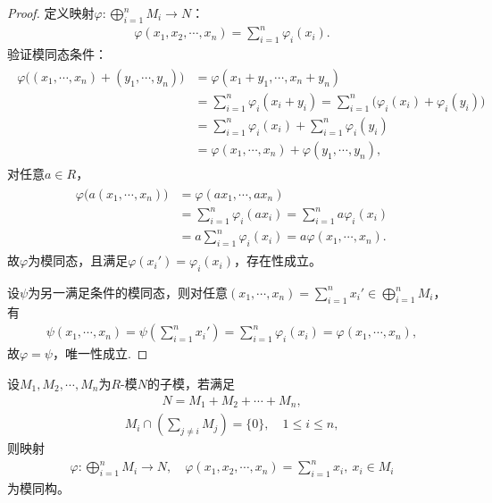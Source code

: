 \documentclass[../../main.tex]{subfiles}%
\begin{document}
\begin{proof}

定义映射$\varphi\colon \bigoplus\limits_{i=1}^n M_i\to N$：
\begin{align*}
\varphi(x_1,x_2,\cdots,x_n)=\sum\limits_{i=1}^n \varphi_i(x_i).
\end{align*}
验证模同态条件：
\begin{align*}
\begin{split}
\varphi\big((x_1,\cdots,x_n)+(y_1,\cdots,y_n)\big)
&=\varphi(x_1+y_1,\cdots,x_n+y_n)\\
&=\sum\limits_{i=1}^n \varphi_i(x_i+y_i)=\sum\limits_{i=1}^n \big(\varphi_i(x_i)+\varphi_i(y_i)\big)\\
&=\sum\limits_{i=1}^n \varphi_i(x_i)+\sum\limits_{i=1}^n \varphi_i(y_i)\\
&=\varphi(x_1,\cdots,x_n)+\varphi(y_1,\cdots,y_n),
\end{split}
\end{align*}
对任意$a\in R$，
\begin{align*}
\begin{split}
\varphi\big(a(x_1,\cdots,x_n)\big)&=\varphi(ax_1,\cdots,ax_n)\\
&=\sum\limits_{i=1}^n \varphi_i(ax_i)=\sum\limits_{i=1}^n a\varphi_i(x_i)\\
&=a\sum\limits_{i=1}^n \varphi_i(x_i)=a\varphi(x_1,\cdots,x_n).
\end{split}
\end{align*}
故$\varphi$为模同态，且满足$\varphi(x_i')=\varphi_i(x_i)$，存在性成立。

设$\psi$为另一满足条件的模同态，则对任意$(x_1,\cdots,x_n)=\sum\limits_{i=1}^n x_i'\in \bigoplus\limits_{i=1}^n M_i$，有
\begin{align*}
\psi(x_1,\cdots,x_n)=\psi\left(\sum\limits_{i=1}^n x_i'\right)=\sum\limits_{i=1}^n \varphi_i(x_i)=\varphi(x_1,\cdots,x_n),
\end{align*}
故$\varphi=\psi$，唯一性成立.

\end{proof}

\begin{theorem}
设$M_1,M_2,\cdots,M_n$为$R$-模$N$的子模，若满足
\begin{align}
N=M_1+M_2+\cdots+M_n,\label{eq:5.2.3}
\end{align}
\begin{align}
M_i\cap\left(\sum\limits_{j\neq i} M_j\right)=\{0\},\quad 1\leqslant i\leqslant n,\label{eq:5.2.4}
\end{align}
则映射
\begin{align*}
\varphi\colon \bigoplus\limits_{i=1}^n M_i\to N,\quad \varphi(x_1,x_2,\cdots,x_n)=\sum\limits_{i=1}^n x_i,\ x_i\in M_i
\end{align*}
为模同构。
\end{theorem}
\end{document}
